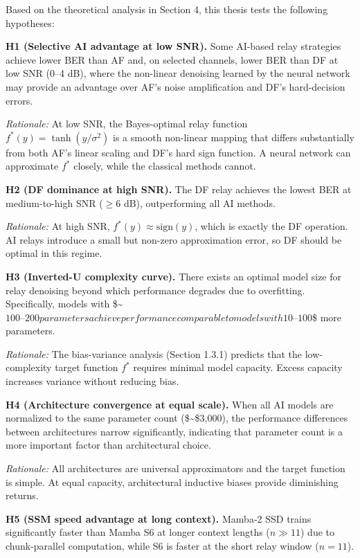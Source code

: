 \documentclass[
  english,
  12pt,
  12pt,
  a4paper,
  oneside]{report}
\begin{document}
Based on the theoretical analysis in Section 4, this thesis tests the following hypotheses:

\textbf{H1 (Selective AI advantage at low SNR).} Some AI-based relay strategies achieve lower BER than AF and, on selected channels, lower BER than DF at low SNR (0--4 dB), where the non-linear denoising learned by the neural network may provide an advantage over AF's noise amplification and DF's hard-decision errors.

\emph{Rationale:} At low SNR, the Bayes-optimal relay function \(f^*(y) = \tanh(y/\sigma^2)\) is a smooth non-linear mapping that differs substantially from both AF's linear scaling and DF's hard sign function. A neural network can approximate \(f^*\) closely, while the classical methods cannot.

\textbf{H2 (DF dominance at high SNR).} The DF relay achieves the lowest BER at medium-to-high SNR (\(\geq 6\) dB), outperforming all AI methods.

\emph{Rationale:} At high SNR, \(f^*(y) \approx \text{sign}(y)\), which is exactly the DF operation. AI relays introduce a small but non-zero approximation error, so DF should be optimal in this regime.

\textbf{H3 (Inverted-U complexity curve).} There exists an optimal model size for relay denoising beyond which performance degrades due to overfitting. Specifically, models with \$\sim\(100–200 parameters achieve performance comparable to models with 10–100\)\times\$ more parameters.

\emph{Rationale:} The bias-variance analysis (Section 1.3.1) predicts that the low-complexity target function \(f^*\) requires minimal model capacity. Excess capacity increases variance without reducing bias.

\textbf{H4 (Architecture convergence at equal scale).} When all AI models are normalized to the same parameter count (\$\sim\$3,000), the performance differences between architectures narrow significantly, indicating that parameter count is a more important factor than architectural choice.

\emph{Rationale:} All architectures are universal approximators and the target function is simple. At equal capacity, architectural inductive biases provide diminishing returns.

\textbf{H5 (SSM speed advantage at long context).} Mamba-2 SSD trains significantly faster than Mamba S6 at longer context lengths (\(n \gg 11\)) due to chunk-parallel computation, while S6 is faster at the short relay window (\(n = 11\)).
\end{document}
